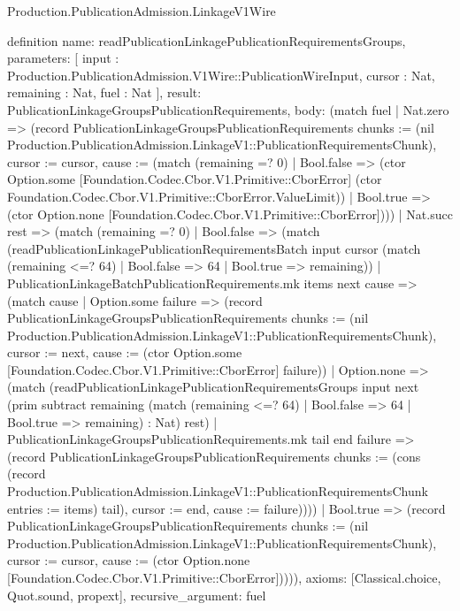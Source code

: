 \begin{lexlean}{Production.PublicationAdmission.LinkageV1Wire}
\begin{semanticmodule}
definition{
  name: readPublicationLinkagePublicationRequirementsGroups,
  parameters: [
    input : Production.PublicationAdmission.V1Wire::PublicationWireInput,
    cursor : Nat,
    remaining : Nat,
    fuel : Nat
  ],
  result: PublicationLinkageGroupsPublicationRequirements,
  body: (match fuel
    | Nat.zero => (record PublicationLinkageGroupsPublicationRequirements {chunks := (nil Production.PublicationAdmission.LinkageV1::PublicationRequirementsChunk), cursor := cursor, cause := (match (remaining =? 0)
      | Bool.false => (ctor Option.some [Foundation.Codec.Cbor.V1.Primitive::CborError] (ctor Foundation.Codec.Cbor.V1.Primitive::CborError.ValueLimit))
      | Bool.true => (ctor Option.none [Foundation.Codec.Cbor.V1.Primitive::CborError]))})
    | Nat.succ rest => (match (remaining =? 0)
      | Bool.false => (match (readPublicationLinkagePublicationRequirementsBatch input cursor (match (remaining <=? 64)
          | Bool.false => 64
          | Bool.true => remaining))
        | PublicationLinkageBatchPublicationRequirements.mk items next cause => (match cause
          | Option.some failure => (record PublicationLinkageGroupsPublicationRequirements {chunks := (nil Production.PublicationAdmission.LinkageV1::PublicationRequirementsChunk), cursor := next, cause := (ctor Option.some [Foundation.Codec.Cbor.V1.Primitive::CborError] failure)})
          | Option.none => (match (readPublicationLinkagePublicationRequirementsGroups input next (prim subtract remaining (match (remaining <=? 64)
              | Bool.false => 64
              | Bool.true => remaining) : Nat) rest)
            | PublicationLinkageGroupsPublicationRequirements.mk tail end failure => (record PublicationLinkageGroupsPublicationRequirements {chunks := (cons (record Production.PublicationAdmission.LinkageV1::PublicationRequirementsChunk {entries := items}) tail), cursor := end, cause := failure}))))
      | Bool.true => (record PublicationLinkageGroupsPublicationRequirements {chunks := (nil Production.PublicationAdmission.LinkageV1::PublicationRequirementsChunk), cursor := cursor, cause := (ctor Option.none [Foundation.Codec.Cbor.V1.Primitive::CborError])}))),
  axioms: [Classical.choice, Quot.sound, propext],
  recursive_argument: fuel
}


\end{semanticmodule}
\end{lexlean}
